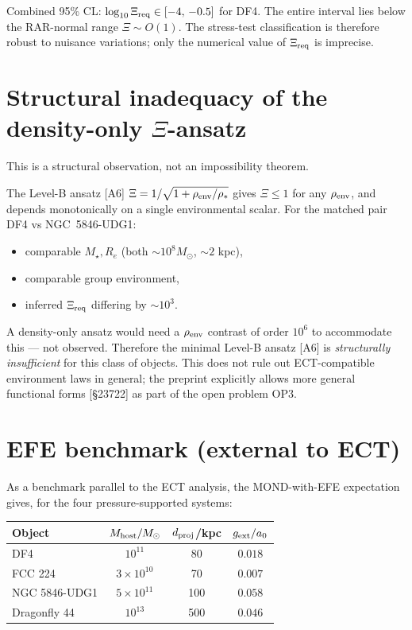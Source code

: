 \documentclass[11pt]{article}
\begin{document}
Combined 95\% CL: $\log_{10}\Xi_{\rm req}\in[-4,\,-0.5]$ for DF4. The
entire interval lies below the RAR-normal range $\Xi\sim O(1)$. The
stress-test classification is therefore robust to nuisance variations;
only the numerical value of $\Xi_{\rm req}$ is imprecise.

\section{Structural inadequacy of the density-only $\Xi$-ansatz}

This is a structural observation, not an impossibility theorem.

The Level-B ansatz [A6] $\Xi = 1/\sqrt{1+\rho_{\rm env}/\rho_*}$ gives
$\Xi\leq 1$ for any $\rho_{\rm env}$, and depends monotonically on a
single environmental scalar. For the matched pair DF4 vs
NGC~5846-UDG1:
\begin{itemize}
\item comparable $M_\star,R_e$ (both $\sim 10^8 M_\odot$, $\sim 2$ kpc),
\item comparable group environment,
\item inferred $\Xi_{\rm req}$ differing by $\sim 10^3$.
\end{itemize}
A density-only ansatz would need a $\rho_{\rm env}$ contrast of order
$10^6$ to accommodate this --- not observed. Therefore the minimal
Level-B ansatz [A6] is \emph{structurally insufficient} for this class
of objects. This does not rule out ECT-compatible environment laws in
general; the preprint explicitly allows more general functional forms
[\S23722] as part of the open problem OP3.

\section{EFE benchmark (external to ECT)}

As a benchmark parallel to the ECT analysis, the MOND-with-EFE
expectation gives, for the four pressure-supported systems:

\begin{center}
\begin{tabular}{lccc}
\toprule
Object & $M_{\rm host}/M_\odot$ & $d_{\rm proj}$/kpc & $g_{\rm ext}/a_0$\\
\midrule
DF4           & $10^{11}$        & 80  & $0.018$ \\
FCC 224       & $3\times10^{10}$ & 70  & $0.007$ \\
NGC 5846-UDG1 & $5\times10^{11}$ & 100 & $0.058$ \\
Dragonfly 44  & $10^{13}$        & 500 & $0.046$ \\
\bottomrule
\end{tabular}
\end{center}
\end{document}
